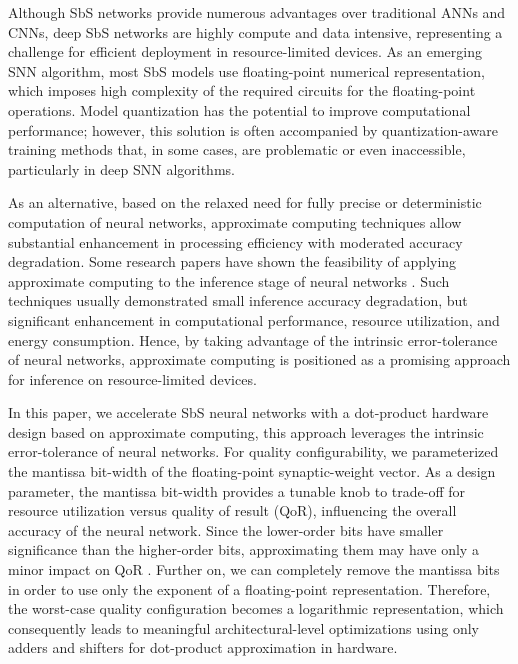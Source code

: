 Although SbS networks provide numerous advantages over traditional ANNs and CNNs, deep SbS networks are highly compute and data intensive, representing a challenge for efficient deployment in resource-limited devices. As an emerging SNN algorithm, most SbS models use floating-point numerical representation, which imposes high complexity of the required circuits for the floating-point operations. Model quantization has the potential to improve computational performance; however, this solution is often accompanied by quantization-aware training methods that, in some cases, are problematic or even inaccessible, particularly in deep SNN algorithms\cite{zhang2018survey}.

As an alternative, based on the relaxed need for fully precise or deterministic computation of neural networks, approximate computing techniques allow substantial enhancement in processing efficiency with moderated accuracy degradation. Some research papers have shown the feasibility of applying approximate computing to the inference stage of neural networks \cite{lotrivc2012applicability, sarwar2016multiplier, mrazek2016design, du2014leveraging}. Such techniques usually demonstrated small inference accuracy degradation, but significant enhancement in computational performance, resource utilization, and energy consumption. Hence, by taking advantage of the intrinsic error-tolerance of neural networks, approximate computing is positioned as a promising approach for inference on resource-limited devices.

In this paper, we accelerate SbS neural networks with a dot-product hardware design based on approximate computing, this approach leverages the intrinsic error-tolerance of neural networks. For quality configurability, we parameterized the mantissa bit-width of the floating-point synaptic-weight vector. As a design parameter, the mantissa bit-width provides a tunable knob to trade-off for resource utilization versus quality of result (QoR)\cite{park2009dynamic, han2013approximate}, influencing the overall accuracy of the neural network. Since the lower-order bits have smaller significance than the higher-order bits, approximating them may have only a minor impact on QoR \cite{gupta2011impact, mittal2016survey}. Further on, we can completely remove the mantissa bits in order to use only the exponent of a floating-point representation. Therefore, the worst-case quality configuration becomes a logarithmic representation, which consequently leads to meaningful architectural-level optimizations using only adders and shifters for dot-product approximation in hardware.


